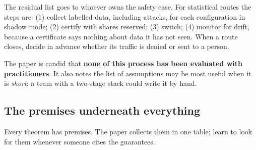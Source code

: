 The residual list goes to whoever owns the safety case. For statistical routes the steps are: (1) collect labelled data, including attacks, for each configuration in shadow mode; (2) certify with shares reserved; (3) switch; (4) monitor for drift, because a certificate says nothing about data it has not seen. When a route closes, decide in advance whether its traffic is denied or sent to a person.

The paper is candid that \textbf{none of this process has been evaluated with practitioners}. It also notes the list of assumptions may be most useful when it is \emph{short}: a team with a two-stage stack could write it by hand.

\subsection{The premises underneath everything}

Every theorem has premises. The paper collects them in one table; learn to look for them whenever someone cites the guarantees.

